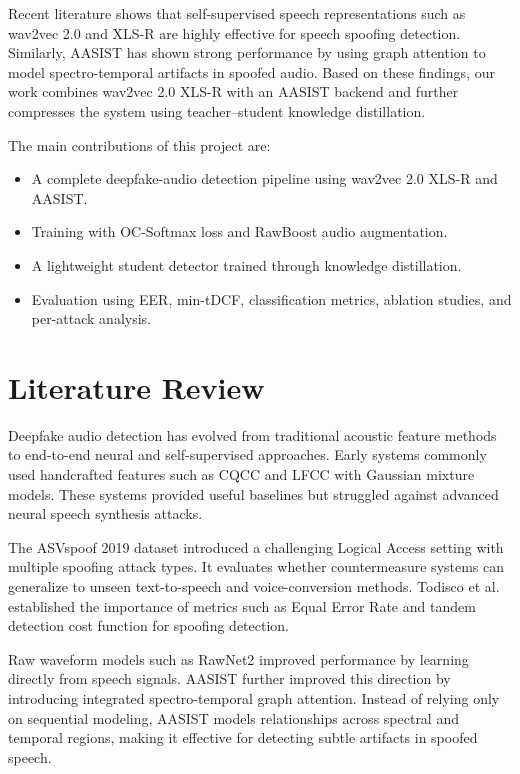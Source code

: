 \documentclass[sigconf]{acmart}
\begin{document}
Recent literature shows that self-supervised speech representations such as wav2vec 2.0 and XLS-R are highly effective for speech spoofing detection. Similarly, AASIST has shown strong performance by using graph attention to model spectro-temporal artifacts in spoofed audio. Based on these findings, our work combines wav2vec 2.0 XLS-R with an AASIST backend and further compresses the system using teacher--student knowledge distillation.

The main contributions of this project are:
\begin{itemize}
    \item A complete deepfake-audio detection pipeline using wav2vec 2.0 XLS-R and AASIST.
    \item Training with OC-Softmax loss and RawBoost audio augmentation.
    \item A lightweight student detector trained through knowledge distillation.
    \item Evaluation using EER, min-tDCF, classification metrics, ablation studies, and per-attack analysis.
\end{itemize}

\section{Literature Review}

Deepfake audio detection has evolved from traditional acoustic feature methods to end-to-end neural and self-supervised approaches. Early systems commonly used handcrafted features such as CQCC and LFCC with Gaussian mixture models. These systems provided useful baselines but struggled against advanced neural speech synthesis attacks.

The ASVspoof 2019 dataset introduced a challenging Logical Access setting with multiple spoofing attack types. It evaluates whether countermeasure systems can generalize to unseen text-to-speech and voice-conversion methods. Todisco et al. established the importance of metrics such as Equal Error Rate and tandem detection cost function for spoofing detection.

Raw waveform models such as RawNet2 improved performance by learning directly from speech signals. AASIST further improved this direction by introducing integrated spectro-temporal graph attention. Instead of relying only on sequential modeling, AASIST models relationships across spectral and temporal regions, making it effective for detecting subtle artifacts in spoofed speech.
\end{document}
